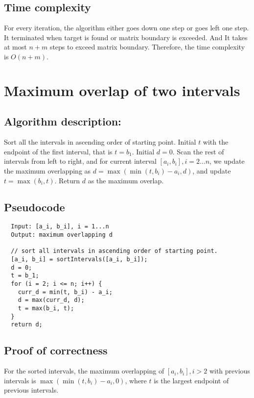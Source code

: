\documentclass[paper=a4, fontsize=11pt]{scrartcl} %
\numberwithin{equation}{section} %
\numberwithin{figure}{section} %
\numberwithin{table}{section} %
\newcounter{claimcounter}
\numberwithin{claimcounter}{section}
\newenvironment{claim}{\stepcounter{claimcounter}{\textbf{Claim \theclaimcounter:}}}{}
\begin{document}
\subsection*{Time complexity}
For every iteration, the algorithm either goes down one step or goes left 
one step. It terminated when target is found or matrix boundary is
exceeded. And It takes at most $n+m$ steps to exceed matrix boundary. 
Therefore, the time complexity is $O(n+m)$. 



\section{Maximum overlap of two intervals}
\subsection*{Algorithm description:}
Sort all the intervals in ascending order of starting point. Initial $t$ with
the endpoint of the first interval, that is $t = b_1$. Initial $d = 0$. 
Scan the rest of intervals from left to
right, and for current interval $[a_i, b_i], i = 2...n$, we update the maximum overlapping
as $d = \max(\min(t,b_i) - a_i, d)$, and update $t = \max(b_i, t)$. Return $d$ as the maximum overlap. 

\subsection*{Pseudocode}
\begin{verbatim}
  Input: [a_i, b_i], i = 1...n
  Output: maximum overlapping d

  // sort all intervals in ascending order of starting point.
  [a_i, b_i] = sortIntervals([a_i, b_i]);
  d = 0;
  t = b_1;
  for (i = 2; i <= n; i++) {
    curr_d = min(t, b_i) - a_i;
    d = max(curr_d, d);
    t = max(b_i, t);
  }
  return d;
\end{verbatim}

\subsection*{Proof of correctness}
\begin{claim}
  For the sorted intervals, the maximum overlapping of $[a_i, b_i], i > 2$ with
  previous intervals is $\max(\min(t, b_i) - a_i, 0)$, where $t$ is the largest
  endpoint of previous intervals.
\end{claim}
\end{document}
